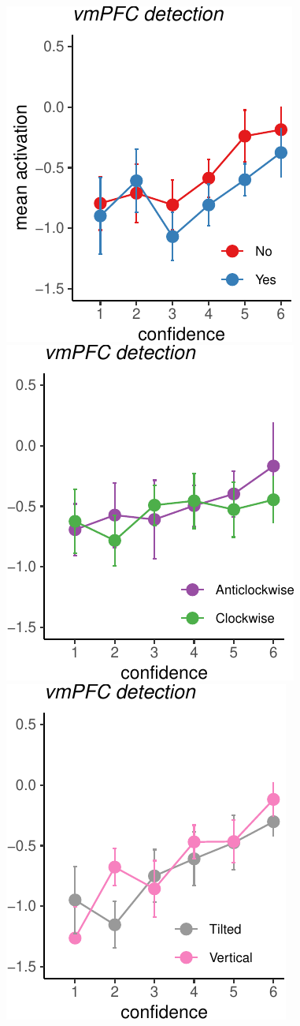 \documentclass[]{article}
\begin{document}
~

\includegraphics{Chudi-Thesis_files/figure-latex/unnamed-chunk-8-1.pdf}
\includegraphics{Chudi-Thesis_files/figure-latex/unnamed-chunk-8-2.pdf}
\includegraphics{Chudi-Thesis_files/figure-latex/unnamed-chunk-8-3.pdf}
\end{document}
